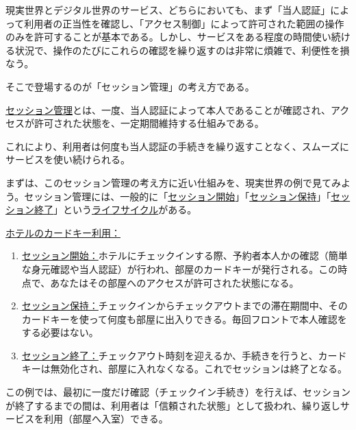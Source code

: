 \documentclass[uplatex]{jsarticle}
\def\label#1{}%
\begin{document}
現実世界とデジタル世界のサービス、どちらにおいても、まず「当人認証」によって利用者の正当性を確認し、「アクセス制御」によって許可された範囲の操作のみを許可することが基本である。しかし、サービスをある程度の時間使い続ける状況で、操作のたびにこれらの確認を繰り返すのは非常に煩雑で、利便性を損なう。

そこで登場するのが「セッション管理」の考え方である。

\begin{dfn}\label{dfn:ch2b-session-management-refined}
\underline{セッション管理}とは、一度、当人認証によって本人であることが確認され、アクセスが許可された状態を、一定期間維持する仕組みである。
\end{dfn}

これにより、利用者は何度も当人認証の手続きを繰り返すことなく、スムーズにサービスを使い続けられる。

まずは、このセッション管理の考え方に近い仕組みを、現実世界の例で見てみよう。セッション管理には、一般的に「\underline{セッション開始}」「\underline{セッション保持}」「\underline{セッション終了}」という\underline{ライフサイクル}がある。

\underline{ホテルのカードキー利用：}

\begin{exa}[ホテルのカードキー]\label{exa:ch2b-hotel-cardkey}
\begin{enumerate}
\item \underline{セッション開始：}ホテルにチェックインする際、予約者本人かの確認（簡単な身元確認や当人認証）が行われ、部屋のカードキーが発行される。この時点で、あなたはその部屋へのアクセスが許可された状態になる。
\item \underline{セッション保持：}チェックインからチェックアウトまでの滞在期間中、そのカードキーを使って何度も部屋に出入りできる。毎回フロントで本人確認をする必要はない。
\item \underline{セッション終了：}チェックアウト時刻を迎えるか、手続きを行うと、カードキーは無効化され、部屋に入れなくなる。これでセッションは終了となる。
\end{enumerate}
この例では、最初に一度だけ確認（チェックイン手続き）を行えば、セッションが終了するまでの間は、利用者は「信頼された状態」として扱われ、繰り返しサービスを利用（部屋へ入室）できる。
\end{exa}
\end{document}
